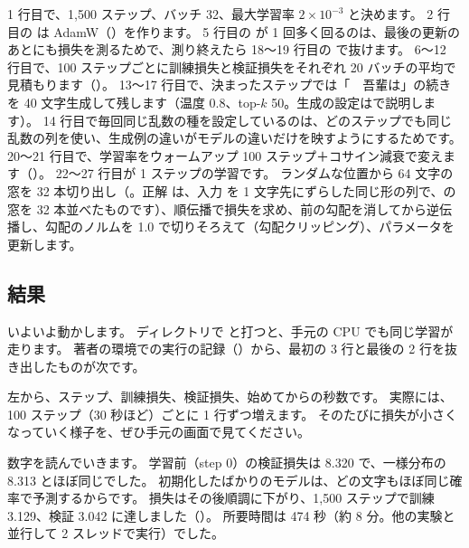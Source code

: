1 行目で、1,500 ステップ、バッチ 32、最大学習率 $2\times10^{-3}$ と決めます。
2 行目の  は AdamW（）を作ります。
5 行目の  が 1 回多く回るのは、最後の更新のあとにも損失を測るためで、測り終えたら 18〜19 行目の  で抜けます。
6〜12 行目で、100 ステップごとに訓練損失と検証損失をそれぞれ 20 バッチの平均で見積もります（）。
13〜17 行目で、決まったステップでは「　吾輩は」の続きを 40 文字生成して残します（温度 0.8、top-$k$ 50。生成の設定はで説明します）。
14 行目で毎回同じ乱数の種を設定しているのは、どのステップでも同じ乱数の列を使い、生成例の違いがモデルの違いだけを映すようにするためです。
20〜21 行目で、学習率をウォームアップ 100 ステップ＋コサイン減衰で変えます（）。
22〜27 行目が 1 ステップの学習です。
ランダムな位置から 64 文字の窓を 32 本切り出し（。正解  は、入力  を 1 文字先にずらした同じ形の列で、の窓を 32 本並べたものです）、順伝播で損失を求め、前の勾配を消してから逆伝播し、勾配のノルムを 1.0 で切りそろえて（勾配クリッピング）、パラメータを更新します。

\subsection*{結果}

いよいよ動かします。
 ディレクトリで  と打つと、手元の CPU でも同じ学習が走ります。
著者の環境での実行の記録（）から、最初の 3 行と最後の 2 行を抜き出したものが次です。

\begin{tcolorbox}[codebox,colback=outbg,title={実行結果（抜粋）},
  fonttitle=\sffamily\scriptsize\bfseries,coltitle=bookgray,colbacktitle=outbg,
  attach title to upper={\par},top=0mm]

\end{tcolorbox}

左から、ステップ、訓練損失、検証損失、始めてからの秒数です。
実際には、100 ステップ（30 秒ほど）ごとに 1 行ずつ増えます。
そのたびに損失が小さくなっていく様子を、ぜひ手元の画面で見てください。

数字を読んでいきます。
学習前（step 0）の検証損失は 8.320 で、一様分布の 8.313 とほぼ同じでした。
初期化したばかりのモデルは、どの文字もほぼ同じ確率で予測するからです。
損失はその後順調に下がり、1,500 ステップで訓練 3.129、検証 3.042 に達しました（）。
所要時間は 474 秒（約 8 分。他の実験と並行して 2 スレッドで実行）でした。

